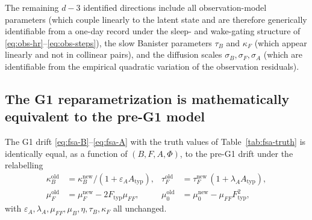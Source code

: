 The remaining $d - 3$ identified directions include all observation-model
parameters (which couple linearly to the latent state and are
therefore generically identifiable from a one-day record under the
sleep- and wake-gating structure of
\eqref{eq:obs-hr}--\eqref{eq:obs-steps}), the slow Banister
parameters $\tau_B$ and $\kappa_F$ (which appear linearly and not in
collinear pairs), and the diffusion scales $\sigma_B,\sigma_F,\sigma_A$
(which are identifiable from the empirical quadratic variation of
the observation residuals).

\subsection{The G1 reparametrization is mathematically equivalent to the pre-G1 model}\label{app:fim-equiv}

\begin{proposition}\label{prop:g1-equiv}
The G1 drift \eqref{eq:fsa-B}--\eqref{eq:fsa-A} with the truth values
of Table~\ref{tab:fsa-truth} is identically equal, as a function of
$(B,F,A,\Phi)$, to the pre-G1 drift under the relabelling
\begin{align*}
  \kappa_B^{\mathrm{old}} &= \kappa_B^{\mathrm{new}}/(1+\varepsilon_A A_{\mathrm{typ}}), &
  \tau_F^{\mathrm{old}}   &= \tau_F^{\mathrm{new}}\,(1+\lambda_A A_{\mathrm{typ}}), \\
  \mu_F^{\mathrm{old}}    &= \mu_F^{\mathrm{new}} - 2 F_{\mathrm{typ}} \mu_{FF}, &
  \mu_0^{\mathrm{old}}    &= \mu_0^{\mathrm{new}} - \mu_{FF} F_{\mathrm{typ}}^2,
\end{align*}
with $\varepsilon_A,\lambda_A,\mu_{FF},\mu_B,\eta,\tau_B,\kappa_F$
all unchanged.
\end{proposition}

